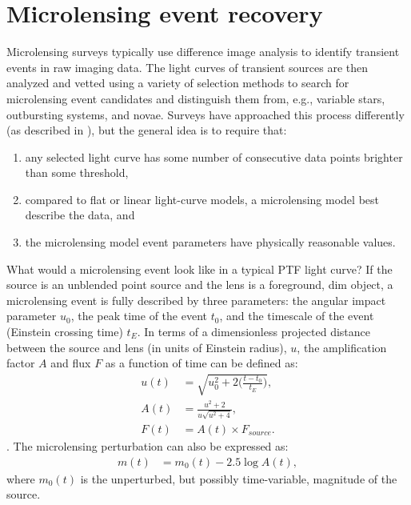 \documentclass{emulateapj}
\begin{document}
\section{Microlensing event recovery} \label{sec:event_recovery}
Microlensing surveys typically use difference image analysis \citep{alard1998} to identify transient events in raw imaging data. The light curves of transient sources are then analyzed and vetted using a variety of selection methods to search for microlensing event candidates and distinguish them from, e.g., variable stars, outbursting systems, and novae. Surveys have approached this process differently (as described in \citealt{ogle_optical_depth, con_idx, alcock2000, macho_detection_efficiency, udalski03,  hamadache2009, wyrzykowski2009, sumi2011}), but the general idea is to require that: 
\begin{enumerate}
	\item any selected light curve has some number of consecutive data points brighter than some threshold,
	\item compared to flat or linear light-curve models, a microlensing model best describe the data, and
	\item the microlensing model event parameters have physically reasonable values.
\end{enumerate}

What would a microlensing event look like in a typical PTF light curve? If the source is an unblended point source and the lens is a foreground, dim object, a microlensing event is fully described by three parameters: the angular impact parameter $u_0$, the peak time of the event $t_0$, and the timescale of the event (Einstein crossing time) $t_E$. In terms of a dimensionless projected distance between the source and lens (in units of Einstein radius), $u$, the amplification factor $A$ and flux $F$ as a function of time can be defined as: 
\begin{align}
	u(t) &= \sqrt{u_0^2 + 2\Big(\frac{t-t_0}{t_E}\Big)},\\
	A(t) &= \frac{u^2 + 2}{u\sqrt{u^2 + 4}},\\
	F(t) &= A(t)\times F_{source}.
\end{align}
\citep{paczynski1986}. The microlensing perturbation can also be expressed as:
\begin{align}\label{eq:ml_model}
	m(t) &= m_0(t) - 2.5\log A(t),
\end{align}
where $m_0(t)$ is the unperturbed, but possibly time-variable, magnitude of the source.
\end{document}
